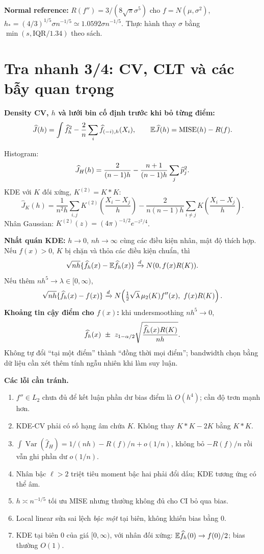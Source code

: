 \documentclass[11pt,a4paper]{article}
\newcommand{\E}{\mathbb E}\newcommand{\Pp}{\mathbb P}
\DeclareMathOperator{\Var}{Var}\DeclareMathOperator{\Cov}{Cov}
\DeclareMathOperator{\MISE}{MISE}\DeclareMathOperator{\AMISE}{AMISE}
\newcommand{\dto}{\xrightarrow{d}}\newcommand{\pto}{\xrightarrow{P}}
\begin{document}
\textbf{Normal reference:} $R(f'')=3/(8\sqrt\pi\sigma^5)$ cho $f=N(\mu,\sigma^2)$,
$h_*= (4/3)^{1/5}\sigma n^{-1/5}\simeq1.0592\sigma n^{-1/5}$.
Thực hành thay $\sigma$ bằng $\min(s,\mathrm{IQR}/1.34)$ theo sách.
\clearpage
\section*{Tra nhanh 3/4: CV, CLT và các bẫy quan trọng}
\textbf{Density CV, $h$ và lưới bin cố định trước khi bỏ từng điểm:}
\[
\widehat J(h)=\int\fh^2-\frac2n\sum_i\widehat f_{(-i),h}(X_i),\qquad
\E\widehat J(h)=\MISE(h)-R(f).
\]
\begin{result}
Histogram:
\[
\widehat J_H(h)=\frac2{(n-1)h}-\frac{n+1}{(n-1)h}\sum_j\widehat p_j^2.
\]
KDE với $K$ đối xứng, $K^{(2)}=K*K$:
\[
\widehat J_K(h)=\frac1{n^2h}\sum_{i,j}K^{(2)}\!\left(\frac{X_i-X_j}{h}\right)
-\frac2{n(n-1)h}\sum_{i\ne j}K\!\left(\frac{X_i-X_j}{h}\right).
\]
Nhân Gaussian: $K^{(2)}(z)=(4\pi)^{-1/2}e^{-z^2/4}$.
\end{result}
\textbf{Nhất quán KDE:} $h\to0$, $nh\to\infty$ cùng các điều kiện nhân, mật độ thích hợp.
Nếu $f(x)>0$, $K$ bị chặn và thỏa các điều kiện chuẩn, thì
\[
\sqrt{nh}\{\fh(x)-\E\fh(x)\}\dto N(0,f(x)R(K)).
\]
Nếu thêm $nh^5\to\lambda\in[0,\infty)$,
\[
\sqrt{nh}\{\fh(x)-f(x)\}\dto
N\!\left(\tfrac12\sqrt\lambda\,\mu_2(K)f''(x),\ f(x)R(K)\right).
\]
\textbf{Khoảng tin cậy điểm cho $f(x)$:} khi undersmoothing $nh^5\to0$,
\[
\fh(x)\ \pm\ z_{1-\alpha/2}\sqrt{\frac{\fh(x)R(K)}{nh}}.
\]
Không tự đổi ``tại một điểm'' thành ``đồng thời mọi điểm''; bandwidth chọn bằng dữ liệu cần xét thêm tính ngẫu nhiên khi làm suy luận.

\textbf{Các lỗi cần tránh.}
\begin{enumerate}
\item $f''\in L_2$ chưa đủ để kết luận phần dư bias điểm là $O(h^4)$; cần độ trơn mạnh hơn.
\item KDE-CV phải có số hạng âm chứa $K$. Không thay $K*K-2K$ bằng $K*K$.
\item $\int\Var(\widehat f_H)=1/(nh)-R(f)/n+o(1/n)$, không bỏ $-R(f)/n$ rồi vẫn ghi phần dư $o(1/n)$.
\item Nhân bậc $\ell>2$ triệt tiêu moment bậc hai phải đổi dấu; KDE tương ứng có thể âm.
\item $h\asymp n^{-1/5}$ tối ưu MISE nhưng thường không đủ cho CI bỏ qua bias.
\item Local linear sửa sai lệch \emph{bậc một} tại biên, không khiến bias bằng 0.
\item KDE tại biên 0 của giá $[0,\infty)$, với nhân đối xứng: $\E\fh(0)\to f(0)/2$; bias thường $O(1)$.
\end{enumerate}
\clearpage
\end{document}
